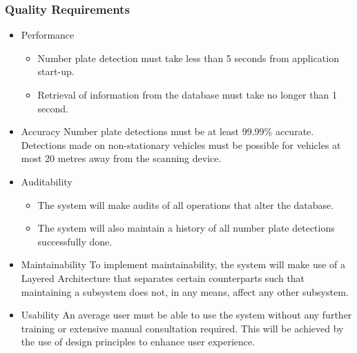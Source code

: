 \documentclass[12pt]{article}
\begin{document}
                			\subsubsection{Quality Requirements}
                					\begin{itemize}
                							\item Performance
	                								\begin{itemize}
						   			                  		\item Number plate detection must take less than 5 seconds from application start-up.
						   			                  		\item Retrieval of information from the database must take no longer than 1 second.
						   			                \end{itemize}
                								
                							\item Accuracy
			              							Number plate detections must be at least 99.99\% accurate. Detections made on non-stationary vehicles must be possible for vehicles at most 20 metres away from the scanning device.
               								
                							\item Auditability
		               								\begin{itemize}
		               									\item The system will make audits of all operations that alter the database.
		               									\item The system will also maintain a history of all number plate detections successfully done.
		               								\end{itemize}
		               									
                							\item Maintainability
                									To implement maintainability, the system will make use of a Layered Architecture that separates certain counterparts such that maintaining a subsystem does not, in any means, affect any other subsystem.
		              								
                							\item Usability
                									An average user must be able to use the system without any further training or extensive manual consultation required. This will be achieved by the use of design principles to enhance user experience.
		               								
                							
                					\end{itemize} 
                			 
\end{document}
